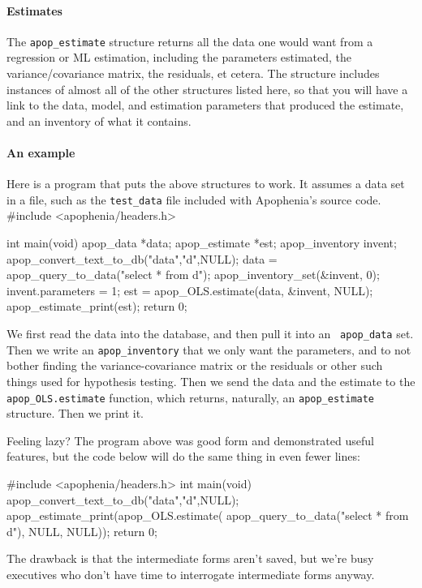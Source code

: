 \paragraph{Estimates}
The {\tt apop\_estimate} structure returns all the data one would want
from a regression or ML estimation, including the parameters estimated,
the variance/covariance matrix, the residuals, et cetera. The structure
includes instances of almost all of the other structures listed here, so
that you will have a link to the data, model, and estimation parameters
that produced the estimate, and an inventory of what it contains.

\paragraph{An example}
Here is a program that puts the above structures to work.  It assumes a
data set in a file, such as the {\tt test\_data} file included with
Apophenia's source code.
#include <apophenia/headers.h>

int main(void){
apop_data       *data;
apop_estimate   *est;
apop_inventory  invent;
    apop_convert_text_to_db("data","d",NULL);
    data       = apop_query_to_data("select * from d");
    apop_inventory_set(&invent, 0);
    invent.parameters   = 1;
    est  = apop_OLS.estimate(data, &invent, NULL);
    apop_estimate_print(est);
    return 0;
}

We first read the data into the database, and then pull it into an {\tt
apop\_\-data} set. Then we write an {\tt apop\_\-inventory} that we only want the
parameters, and to not bother finding the variance-covariance matrix or
the residuals or other such things used for hypothesis testing. Then we
send the data and the estimate to the {\tt apop\_\-OLS.est\-i\-mate}
function, which returns, naturally, an {\tt apop\_\-est\-i\-mate}
structure. Then we print it.

Feeling lazy? The program above was good form and demonstrated useful
features, but the code below will do the same thing in even fewer lines:

#include <apophenia/headers.h>
int main(void){
    apop_convert_text_to_db("data","d",NULL);
    apop_estimate_print(apop_OLS.estimate(
         apop_query_to_data("select * from d"), NULL, NULL));
    return 0; }

The drawback is that the intermediate forms aren't saved, but we're busy
executives who don't have time to interrogate intermediate forms anyway.

